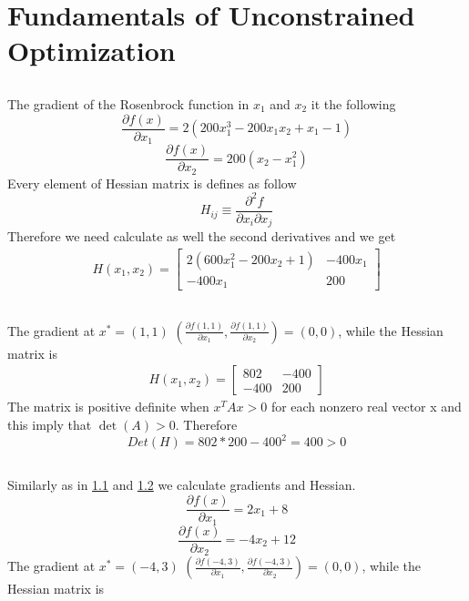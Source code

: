 \documentclass[12pt]{article}
\begin{document}
\section{Fundamentals of Unconstrained Optimization}
\subsection{}
\label{1a}
The gradient of the Rosenbrock function in $x_1$ and $x_2$ it the following
\begin{equation}
\frac{\partial f(x)}{\partial x_1} = 2(200x_1^{3} - 200x_1x_2+x_1-1) 
\end{equation}
\begin{equation}
\frac{\partial f(x)}{\partial x_2} = 200(x_2 - x_1^2)
\end{equation}
Every element of Hessian matrix is defines as follow
\begin{equation}
 H_{ij} \equiv \frac{\partial^{2} f}{\partial x_{i} \partial x_{j} }
\end{equation}
Therefore we need calculate as well the second derivatives and we get
\begin{align}
H(x_1,x_2) = \begin{bmatrix}
2(600x_1^2-200x_2+1) & -400x_1 \\
-400x_1 & 200
\end{bmatrix}
\end{align}
\subsection{}
\label{1b}
The gradient at $x^* = (1,1)$ $(\frac{\partial f(1,1)}{\partial x_1}, \frac{\partial f(1,1)}{\partial x_2})  = (0,0)$, while the Hessian matrix is
\begin{align}
H(x_1,x_2) = \begin{bmatrix}
802 & -400 \\
-400 & 200
\end{bmatrix}
\end{align}
The matrix is positive definite when $x^TAx >0$ for each nonzero real vector x and this imply that $\det(A) > 0$. Therefore
\begin{equation}
Det(H) = 802*200-400^2 = 400 > 0
\end{equation}
\subsection{}
Similarly as in \ref{1a} and \ref{1b} we calculate gradients and Hessian.
\begin{equation}
\frac{\partial f(x)}{\partial x_1} = 2x_1 + 8
\end{equation}
\begin{equation}
\frac{\partial f(x)}{\partial x_2} = -4x_2+12
\end{equation}
The gradient at $x^* = (-4,3)$ $(\frac{\partial f(-4,3)}{\partial x_1}, \frac{\partial f(-4,3)}{\partial x_2})  = (0,0)$, while the Hessian matrix is
\end{document}
